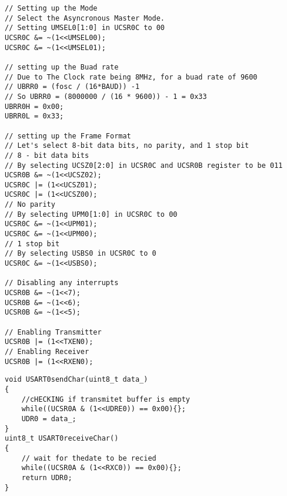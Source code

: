 \begin{verbatim}
// Setting up the Mode
// Select the Asyncronous Master Mode.
// Setting UMSEL0[1:0] in UCSR0C to 00
UCSR0C &= ~(1<<UMSEL00);
UCSR0C &= ~(1<<UMSEL01);

// setting up the Buad rate
// Due to The Clock rate being 8MHz, for a buad rate of 9600
// UBRR0 = (fosc / (16*BAUD)) -1
// So UBRR0 = (8000000 / (16 * 9600)) - 1 = 0x33
UBRR0H = 0x00;
UBRR0L = 0x33;

// setting up the Frame Format
// Let's select 8-bit data bits, no parity, and 1 stop bit
// 8 - bit data bits
// By selecting UCSZ0[2:0] in UCSR0C and UCSR0B register to be 011
UCSR0B &= ~(1<<UCSZ02);
UCSR0C |= (1<<UCSZ01);
UCSR0C |= (1<<UCSZ00);
// No parity
// By selecting UPM0[1:0] in UCSR0C to 00
UCSR0C &= ~(1<<UPM01);
UCSR0C &= ~(1<<UPM00);
// 1 stop bit
// By selecting USBS0 in UCSR0C to 0 
UCSR0C &= ~(1<<USBS0);

// Disabling any interrupts
UCSR0B &= ~(1<<7);
UCSR0B &= ~(1<<6);
UCSR0B &= ~(1<<5);

// Enabling Transmitter 
UCSR0B |= (1<<TXEN0);
// Enabling Receiver
UCSR0B |= (1<<RXEN0);
\end{verbatim}

\begin{verbatim}
void USART0sendChar(uint8_t data_)
{
	//cHECKING if transmitet buffer is empty
	while((UCSR0A & (1<<UDRE0)) == 0x00){};		
	UDR0 = data_;	
}
uint8_t USART0receiveChar()
{
	// wait for thedate to be recied
	while((UCSR0A & (1<<RXC0)) == 0x00){};		
	return UDR0;
}
\end{verbatim}

% 